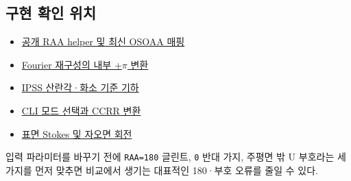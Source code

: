 \subsection{구현 확인 위치}
\label{sec:auto:01_concepts_geometry:7.1}
\begin{itemize}
\item \href{https://github.com/brtnt/OCRT/blob/54861c68e35ec5aaa3938fad53e93dc2dfa7eb1d/code/OCRT_C/src/rt_raa_convention.h}{공개 RAA helper 및 최신 OSOAA 매핑}
\item \href{https://github.com/brtnt/OCRT/blob/54861c68e35ec5aaa3938fad53e93dc2dfa7eb1d/code/OCRT_C/src/rt_fourier.c}{Fourier 재구성의 내부 +\ensuremath{\pi} 변환}
\item \href{https://github.com/brtnt/OCRT/blob/54861c68e35ec5aaa3938fad53e93dc2dfa7eb1d/code/OCRT_C/src/rt_ipss.c}{IPSS 산란각·화소 기준 기하}
\item \href{https://github.com/brtnt/OCRT/blob/54861c68e35ec5aaa3938fad53e93dc2dfa7eb1d/code/OCRT_C/src/main.c}{CLI 모드 선택과 CCRR 변환}
\item \href{https://github.com/brtnt/OCRT/blob/54861c68e35ec5aaa3938fad53e93dc2dfa7eb1d/code/OCRT_C/src/shared/surface.c}{표면 Stokes 및 자오면 회전}
\end{itemize}

입력 파라미터를 바꾸기 전에 \texttt{RAA=\allowbreak{}180\textdegree{}} 글린트, \texttt{0\textdegree{}} 반대 가지, 주평면 밖 U 부호라는 세 가지를 먼저 맞추면 비교에서 생기는 대표적인 180\textdegree{}·부호 오류를 줄일 수 있다.

